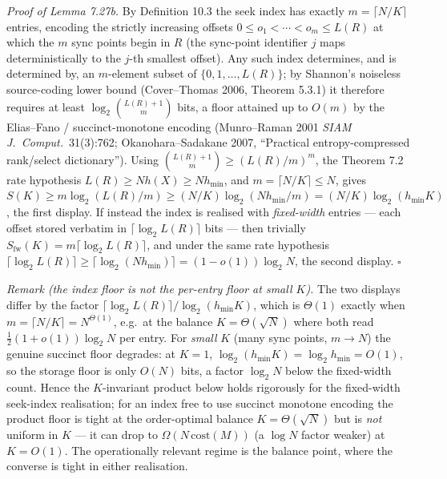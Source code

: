 \documentclass[
]{article}
\begin{document}
\emph{Proof of Lemma 7.27b.} By Definition 10.3 the seek index has
exactly $m = \lceil N/K \rceil$ entries, encoding the strictly
increasing offsets $0 \le o_1 < \cdots < o_m \le L(R)$ at which the
$m$ sync points begin in $R$ (the sync-point identifier $j$ maps
deterministically to the $j$-th smallest offset). Any such index
determines, and is determined by, an $m$-element subset of
$\{0,1,\ldots,L(R)\}$; by Shannon's noiseless source-coding lower
bound (Cover--Thomas 2006, Theorem 5.3.1) it therefore requires at
least $\log_2 \binom{L(R)+1}{m}$ bits, a floor attained up to
$O(m)$ by the Elias--Fano / succinct-monotone encoding (Munro--Raman
2001 \emph{SIAM J.\ Comput.}\ 31(3):762; Okanohara--Sadakane 2007,
``Practical entropy-compressed rank/select dictionary''). Using
$\binom{L(R)+1}{m}\ge (L(R)/m)^m$, the Theorem 7.2 rate hypothesis
$L(R)\ge N h(X)\ge N h_{\min}$, and $m=\lceil N/K\rceil \le N$, gives
$S(K)\ge m\log_2(L(R)/m)\ge (N/K)\log_2(N h_{\min}/m)
= (N/K)\log_2(h_{\min} K)$, the first display. If instead the index
is realised with \emph{fixed-width} entries --- each offset stored
verbatim in $\lceil\log_2 L(R)\rceil$ bits --- then trivially
$S_{\mathrm{fw}}(K)=m\lceil\log_2 L(R)\rceil$, and under the same
rate hypothesis $\lceil\log_2 L(R)\rceil \ge \lceil\log_2(N
h_{\min})\rceil = (1-o(1))\log_2 N$, the second display.
\hfill$\square$

\emph{Remark (the index floor is not the per-entry floor at small
$K$).} The two displays differ by the factor $\lceil\log_2
L(R)\rceil / \log_2(h_{\min}K)$, which is $\Theta(1)$ exactly when
$m=\lceil N/K\rceil = N^{\Theta(1)}$, e.g.\ at the balance
$K=\Theta(\sqrt N)$ where both read $\tfrac12(1+o(1))\log_2 N$ per
entry. For \emph{small} $K$ (many sync points, $m\to N$) the genuine
succinct floor degrades: at $K=1$, $\log_2(h_{\min}K)=\log_2
h_{\min}=O(1)$, so the storage floor is only $O(N)$ bits, a factor
$\log_2 N$ below the fixed-width count. Hence the $K$-invariant
product below holds rigorously for the fixed-width seek-index
realisation; for an index free to use succinct monotone encoding the
product floor is tight at the order-optimal balance
$K=\Theta(\sqrt N)$ but is \emph{not} uniform in $K$ --- it can drop
to $\Omega(N\,\mathrm{cost}(M))$ (a $\log N$ factor weaker) at
$K=O(1)$. The operationally relevant regime is the balance point,
where the converse is tight in either realisation.
\end{document}
